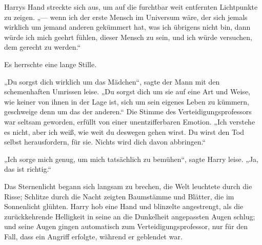 Harrys Hand streckte sich aus, um auf die furchtbar weit entfernten Lichtpunkte zu zeigen. „— wenn ich der erste Mensch im Universum wäre, der sich jemals wirklich um jemand anderen gekümmert hat, was ich übrigens nicht bin, dann würde ich mich geehrt fühlen, dieser Mensch zu sein, und ich würde versuchen, dem gerecht zu werden.“

Es herrschte eine lange Stille.

„Du sorgst dich wirklich um das Mädchen“, sagte der Mann mit den schemenhaften Umrissen leise.
„Du sorgst dich um sie auf eine Art und Weise, wie keiner von ihnen in der Lage ist, sich um sein eigenes Leben zu kümmern, geschweige denn um das der anderen.“ Die Stimme des Verteidigungsprofessors war seltsam geworden, erfüllt von einer unentzifferbaren Emotion.
„Ich verstehe es nicht, aber ich weiß, wie weit du deswegen gehen wirst. Du wirst den Tod selbst herausfordern, für sie. Nichts wird dich davon abbringen.“

„Ich sorge mich genug, um mich tatsächlich zu bemühen“, sagte Harry leise.
„Ja, das ist richtig.“

Das Sternenlicht begann sich langsam zu brechen, die Welt leuchtete durch die Risse; Schlitze durch die Nacht zeigten Baumstämme und Blätter, die im Sonnenlicht glühten. Harry hob eine Hand und blinzelte angestrengt, als die zurückkehrende Helligkeit in seine an die Dunkelheit angepassten Augen schlug; und seine Augen gingen automatisch zum Verteidigungsprofessor, nur für den Fall, dass ein Angriff erfolgte, während er geblendet war.


